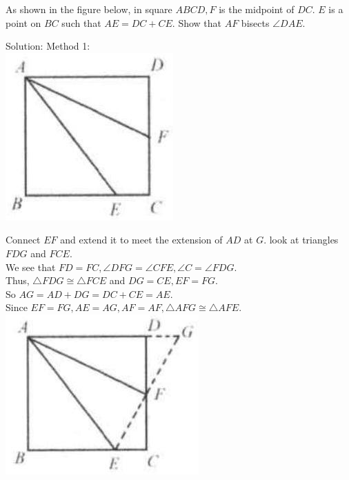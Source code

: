 \documentclass{article}
\begin{document}
As shown in the figure below, in square \(A B C D, F\) is the midpoint of \(D C\). \(E\) is a point on \(B C\) such that \(A E=D C+C E\). Show that \(A F\) bisects \(\angle D A E\).

Solution:
Method 1:\\
\centering
\includegraphics[width=\textwidth]{images/060.jpg}

Connect \(E F\) and extend it to meet the extension of \(A D\) at \(G\). look at triangles \(F D G\) and \(F C E\).\\
We see that \(F D=F C, \angle D F G=\angle C F E, \angle C=\angle F D G\).\\
Thus, \(\triangle F D G \cong \triangle F C E\) and \(D G=C E, E F=F G\).\\
So \(A G=A D+D G=D C+C E=A E\).\\
Since \(E F=F G, A E=A G, A F=A F, \triangle A F G \cong \triangle A F E\).\\
\centering
\includegraphics[width=\textwidth]{images/060(1).jpg}
\end{document}
